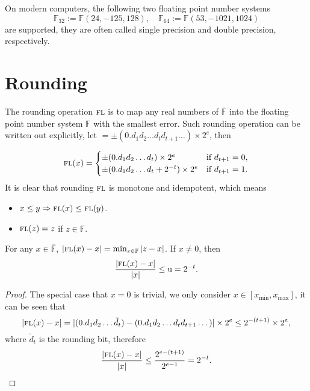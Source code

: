 \begin{remark}
On modern computers, the following two floating point number systems $$\mathbb{F}_{32}:= \mathbb{F}(24, -125, 128),\quad\mathbb{F}_{64}:= \mathbb{F}(53, -1021, 1024)$$ are supported, they are often called single precision and double precision, respectively.  
\end{remark}

\section{Rounding}
\label{Sec: 1-Rou}
The rounding operation $\textsc{fl}$ is to map any real numbers of $\overline{\mathbb{F}}$ into the floating point number system $\mathbb{F}$ with the smallest error. Such rounding operation can be written out explicitly, let $ = \pm (0.d_1 d_2\dots d_t d_{t+1}\dots )\times 2^e$, then

\begin{equation*}
    \textsc{fl}(x) =\begin{cases}
        \pm (0.d_1 d_2\dots d_t) \times 2^e & \text{if } d_{t+1} = 0,\\
        \pm (0.d_1 d_2\dots d_t  + 2^{-t}) \times 2^e & \text{if } d_{t+1} = 1.
    \end{cases}
\end{equation*}
It is clear that rounding $\textsc{fl}$ is monotone and idempotent, which means
\begin{itemize}
    \item $x\le y \Rightarrow \textsc{fl}(x) \le \textsc{fl}(y)$. 
    \item $\textsc{fl}(z) = z$ if $z\in \mathbb{F}$.
\end{itemize}


\begin{theorem}
\label{Thm: 1-Rou-err}
    For any $x\in \overline{\mathbb{F}}$, $|\textsc{fl}(x) - x| = \min_{z\in \mathbb{F}} |z - x|$. If $x\neq 0$, then
    $$\frac{|\textsc{fl}(x) - x|}{|x|}\le \mathrm{u} = 2^{-t}.$$
\end{theorem}

\begin{proof}
    The special case that $x = 0$ is trivial, we only consider $x\in [x_{\min}, x_{\max}]$, it can be seen that 
    \begin{equation*}
        |\textsc{fl}(x) - x| = | (0.d_1d_2\dots \tilde{d}_t) - (0.d_1d_2\dots d_t d_{t+1} \dots )|\times 2^e \le 2^{-(t+1)} \times 2^e,
    \end{equation*}
    where $\tilde{d}_t$ is the rounding bit, therefore 
    \begin{equation*}
        \frac{|\textsc{fl}(x) - x|}{|x|} \le \frac{2^{e-(t+1)}}{2^{e-1}} = 2^{-t}.
    \end{equation*}
\end{proof}

